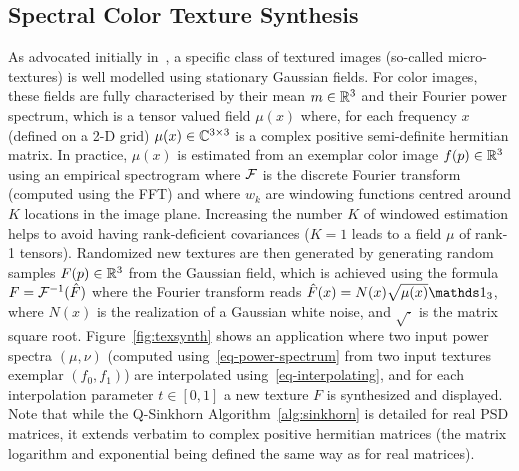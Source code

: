

\subsection{Spectral Color Texture Synthesis}

As advocated initially in~\cite{galerne2011random}, a specific class of textured images (so-called micro-textures) is well modelled using stationary Gaussian fields. For color images, these fields are fully characterised by their mean $m \in \mathbb{R}^3$ and their Fourier power spectrum, which is a tensor valued field $\mu(x)$ where, for each frequency $x$ (defined on a 2-D grid) $\mu(x) \in \mathbb{C}^{3 \times 3}$ is a complex positive semi-definite hermitian matrix. 
%
In practice, $\mu(x)$ is estimated from an exemplar color image $f(p) \in \mathbb{R}^3$ using an empirical spectrogram 
where $\mathcal{F}$ is the discrete Fourier transform (computed using the FFT)
and where $w_k$ are windowing functions centred around $K$ locations in the image plane. 
%
Increasing the number $K$ of windowed estimation helps to avoid having rank-deficient covariances ($K=1$ leads to a field $\mu$ of rank-1 tensors).
%
Randomized new textures are then generated by generating random samples $F(p) \in \mathbb{R}^3$ from the Gaussian field, which is achieved using the formula $F = \mathcal{F}^{-1}( \hat F)$ where the Fourier transform reads $\hat F(x) = N(x) \sqrt{\mu(x)} \ones_3$, where $N(x)$ is the realization of a Gaussian white noise, and $\sqrt{\cdot}$ is the matrix square root.
%
Figure~\ref{fig:texsynth} shows an application where two input power spectra $(\mu,\nu)$ (computed using~\eqref{eq-power-spectrum} from two input textures exemplar $(f_0,f_1)$)  are interpolated using~\eqref{eq-interpolating}, and for each interpolation parameter $t \in [0,1]$ a new texture $F$ is synthesized and displayed.
%
Note that while the Q-Sinkhorn Algorithm~\ref{alg:sinkhorn} is detailed for real PSD matrices, it extends verbatim to complex positive hermitian matrices (the matrix logarithm and exponential being defined the same way as for real matrices).



